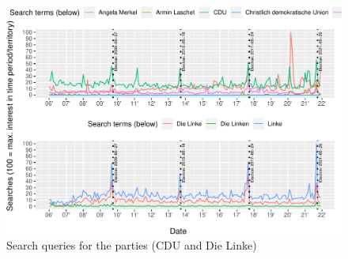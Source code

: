 \documentclass[
  letterpaper,
  DIV=11,
  numbers=noendperiod]{scrartcl}
\begin{document}
\begin{figure}[h]

\caption{\label{fig-1}Search queries for the parties (CDU and Die
Linke)}

{\centering \includegraphics{figures/fig-1-1.pdf}

}

\end{figure}
\end{document}
